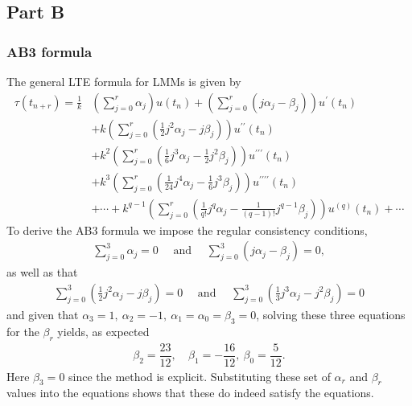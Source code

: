 \documentclass[12pt]{article}
\begin{document}
\subsection*{Part B}

\subsubsection*{AB3 formula}
The general LTE formula for LMMs is given by 
\begin{align}
	\tau\left(t_{n+r}\right)=\frac{1}{k} &\left(\sum_{j=0}^{r} \alpha_{j}\right) u\left(t_{n}\right)+\left(\sum_{j=0}^{r}\left(j \alpha_{j}-\beta_{j}\right)\right) u^{\prime}\left(t_{n}\right) \nonumber\\ &+k\left(\sum_{j=0}^{r}\left(\frac{1}{2} j^{2} \alpha_{j}-j \beta_{j}\right)\right) u^{\prime \prime}\left(t_{n}\right) \nonumber\\
	&+k^{2}\left(\sum_{j=0}^{r}\left(\frac{1}{6} j^{3} \alpha_{j}-\frac{1}{2} j^{2} \beta_{j}\right)\right) u^{\prime\prime\prime}\left(t_{n}\right) \nonumber\\
	&+k^{3}\left(\sum_{j=0}^{r}\left(\frac{1}{24} j^{4} \alpha_{j}-\frac{1}{6} j^{3} \beta_{j}\right)\right) u^{\prime\prime\prime\prime}\left(t_{n}\right)\nonumber\\
	&+\cdots+k^{q-1}\left(\sum_{j=0}^{r}\left(\frac{1}{q !} j^{q} \alpha_{j}-\frac{1}{(q-1) !} j^{q-1} \beta_{j}\right)\right) u^{(q)}\left(t_{n}\right)+\cdots\label{eq:gen_trunc_err}
\end{align}
To derive the AB3 formula we impose the regular consistency conditions, 
\begin{align}
	\sum_{j=0}^{3} \alpha_{j}=0 \quad \text { and } \quad \sum_{j=0}^{3} \left(j \alpha_{j}-\beta_{j}\right)=0,
\end{align}
as well as that 
\begin{align}
	\sum_{j=0}^{3}\left(\frac{1}{2} j^{2} \alpha_{j}-j \beta_{j}\right) = 0\quad \text{ and }\quad \sum_{j=0}^{3}\left(\frac{1}{3} j^{3} \alpha_{j}- j^{2} \beta_{j}\right) = 0
\end{align}
and given that $\alpha_{3} = 1,\ \alpha_{2} = -1,\ \alpha_{1} = \alpha_{0} = \beta_{3} = 0$,
solving these three equations for the $\beta_{r}$ yields, as expected
\begin{subequations}
	\begin{align}
		\beta_{2} = \dfrac{23}{12},\ &\beta_{1} = -\dfrac{16}{12},\ \beta_{0}=\dfrac{5}{12}.
	\end{align}
\end{subequations}
Here $\beta_{3} = 0$ since the method is explicit. Substituting these set of $\alpha_{r}$ and $\beta_{r}$ values into the equations shows that these do indeed satisfy the equations. 
\end{document}
